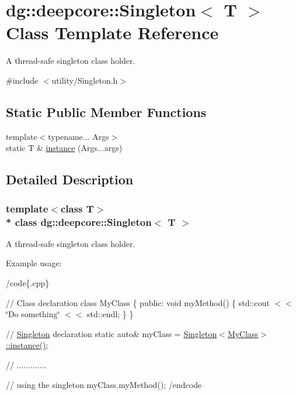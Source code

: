 \hypertarget{classdg_1_1deepcore_1_1_singleton}{}\section{dg\+:\+:deepcore\+:\+:Singleton$<$ T $>$ Class Template Reference}
\label{classdg_1_1deepcore_1_1_singleton}


A thread-\/safe singleton class holder.  




{\ttfamily \#include $<$utility/\+Singleton.\+h$>$}

\subsection*{Static Public Member Functions}
\begin{DoxyCompactItemize}
\item 
{\footnotesize template$<$typename... Args$>$ }\\static T \& \hyperlink{classdg_1_1deepcore_1_1_singleton_a7f8312195e3d6d9a7755b571714562d1}{instance} (Args...\+args)
\end{DoxyCompactItemize}


\subsection{Detailed Description}
\subsubsection*{template$<$class T$>$\\*
class dg\+::deepcore\+::\+Singleton$<$ T $>$}

A thread-\/safe singleton class holder. 

Example usage\+:

/code\{.cpp\}

// Class declaration class My\+Class \{ public\+: void my\+Method() \{ std\+::cout $<$$<$ \char`\"{}\+Do something\char`\"{} $<$$<$ std\+::endl; \} \}

// \hyperlink{classdg_1_1deepcore_1_1_singleton}{Singleton} declaration static auto\& my\+Class = \hyperlink{classdg_1_1deepcore_1_1_singleton_a7f8312195e3d6d9a7755b571714562d1}{Singleton$<$\+My\+Class$>$\+::instance()};

// .............

// using the singleton my\+Class.\+my\+Method(); /endcode 

